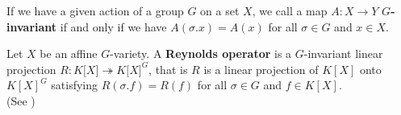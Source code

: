 

\begin{definition}
  If we have a given action of a group $G$ on a set $X$, we call a map $A \colon X \rightarrow Y$ \textbf{$G$-invariant} if and only if we have $A(\sigma.x) = A(x)$ for all $\sigma \in G$ and $x \in X$.
\end{definition}

\begin{definition}
  Let $ X $ be an affine $G$-variety.
  A \textbf{Reynolds operator} is a $ G $-invariant linear projection $R \colon K\lbrack X \rbrack \twoheadrightarrow K\lbrack X \rbrack^G $, that is $R$ is a linear projection of $K[X]$ onto $K[X]^G$ satisfying $R(\sigma.f) = R(f)$ for all $\sigma \in G$ and $f \in K[X]$.  \\
  (See \cite[2.2.2]{DK15})
\end{definition}

